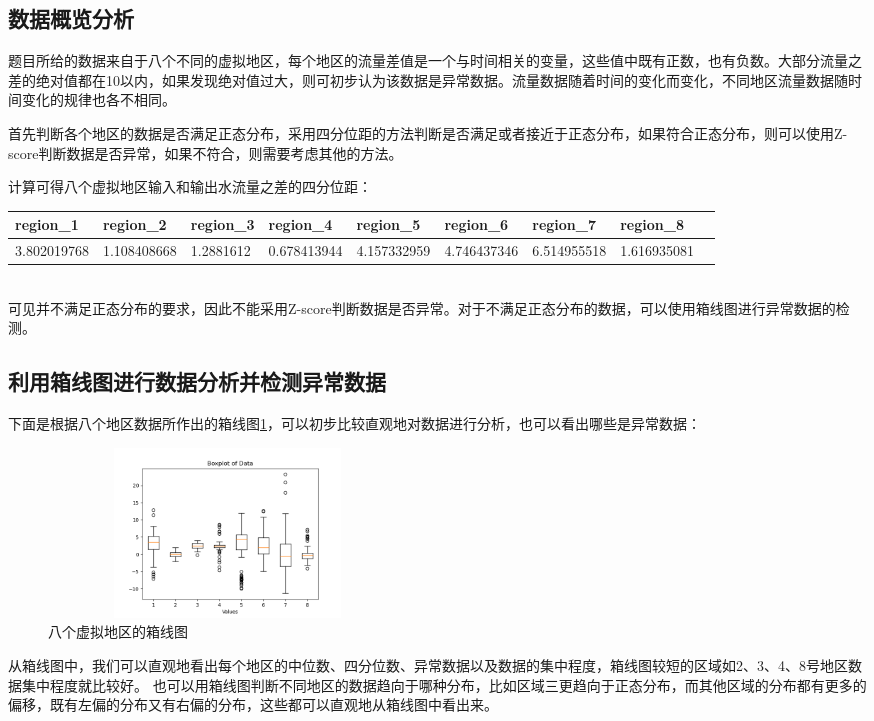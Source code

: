 \documentclass[UTF8]{article}
\begin{document}
		\subsection{数据概览分析}
			\par 题目所给的数据来自于八个不同的虚拟地区，每个地区的流量差值是一个与时间相关的变量，这些值中既有正数，也有负数。大部分流量之差的绝对值都在10以内，如果发现绝对值过大，则可初步认为该数据是异常数据。流量数据随着时间的变化而变化，不同地区流量数据随时间变化的规律也各不相同。
			\par 首先判断各个地区的数据是否满足正态分布，采用四分位距的方法判断是否满足或者接近于正态分布，如果符合正态分布，则可以使用Z-score判断数据是否异常，如果不符合，则需要考虑其他的方法。
			\par 计算可得八个虚拟地区输入和输出水流量之差的四分位距：
			\begin{table}[!ht]
				\centering
				\resizebox{0.8\textwidth}{!}
				{
					\begin{tabular}{|l|l|l|l|l|l|l|l|l|}
					\hline
						region\_1 & region\_2 & region\_3 & region\_4 & region\_5 & region\_6 & region\_7 & region\_8 \\ \hline
						3.802019768 & 1.108408668 & 1.2881612 & 0.678413944 & 4.157332959 & 4.746437346 & 6.514955518 & 1.616935081 \\ \hline
					\end{tabular}
				}
			\end{table}
			\\可见并不满足正态分布的要求，因此不能采用Z-score判断数据是否异常。对于不满足正态分布的数据，可以使用箱线图进行异常数据的检测。
			\newpage
			\subsection{利用箱线图进行数据分析并检测异常数据}
			下面是根据八个地区数据所作出的箱线图\ref{Box}，可以初步比较直观地对数据进行分析，也可以看出哪些是异常数据：
			\begin{figure}[!ht]
				\centering %
				\includegraphics[height=4.5cm,width=9.5cm]{pictures/BoxPlot.png}
				\caption{八个虚拟地区的箱线图}
				\label{Box}
			\end{figure}
			\par 从箱线图中，我们可以直观地看出每个地区的中位数、四分位数、异常数据以及数据的集中程度，箱线图较短的区域如2、3、4、8号地区数据集中程度就比较好。
			也可以用箱线图判断不同地区的数据趋向于哪种分布，比如区域三更趋向于正态分布，而其他区域的分布都有更多的偏移，既有左偏的分布又有右偏的分布，这些都可以直观地从箱线图中看出来。
\end{document}

